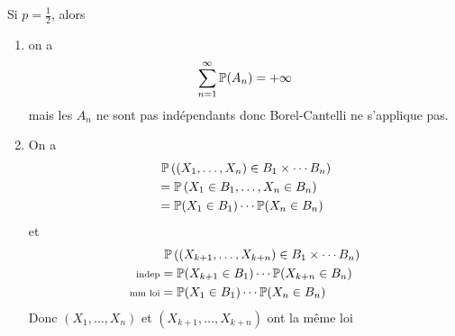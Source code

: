 {\begin{td-sol}[]
\begin{enumerate}
            Si \(p=\frac12\), alors
            \begin{enumerate}
                \item on a
                \begin{equation*}
                    \sum_{n=1}^\infty \mathbb{P}(A_n)=+\infty
                \end{equation*}
                mais les \(A_n\) ne sont pas indépendants donc Borel-Cantelli 
                ne s'applique pas.

                \item On a
                \begin{equation*}
                    \begin{aligned}
                        &~\mathbb{P}\left((X_1,\ldots,X_n)\in B_1\times\cdots B_n\right)\\
                        &=\mathbb{P}\left(X_1\in B_1,\ldots,X_n\in B_n\right)\\
                        &=\mathbb{P}(X_1\in B_1)\cdots \mathbb{P}(X_n\in B_n)
                    \end{aligned}
                \end{equation*}
                et
                \begin{equation*}
                    \begin{aligned}
                        &~\mathbb{P}\left((X_{k+1},\ldots,X_{k+n})\in B_1\times\cdots B_n\right)\\
                        \text{\scriptsize{indep}}&=\mathbb{P}(X_{k+1}\in B_1)\cdots \mathbb{P}(X_{k+n}\in B_n)\\
                        \text{\scriptsize{mm loi}}&=\mathbb{P}(X_1\in B_1)\cdots \mathbb{P}(X_n\in B_n)
                    \end{aligned}
                \end{equation*}
                Donc \((X_1,\ldots,X_n)\) et \((X_{k+1},\ldots,X_{k+n})\) ont
                la même loi


\end{enumerate}
\end{enumerate}
\end{td-sol}}
